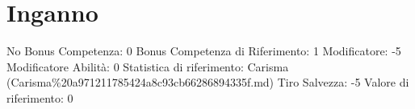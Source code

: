\section{Inganno}\label{inganno}

\begin{description}
\tightlist
\item[Tags: ABI]
No Bonus Competenza: 0 Bonus Competenza di Riferimento: 1 Modificatore:
-5 Modificatore Abilità: 0 Statistica di riferimento: Carisma
(Carisma\%20a971211785424a8c93cb66286894335f.md) Tiro Salvezza: -5
Valore di riferimento: 0
\end{description}

